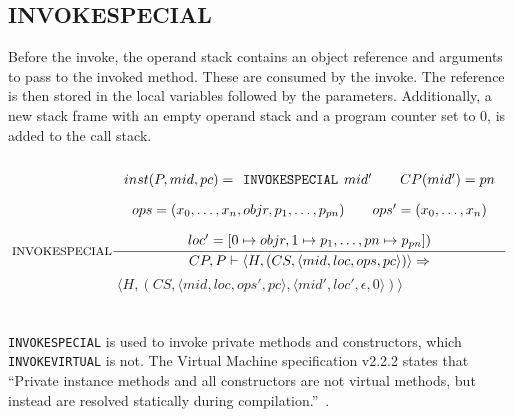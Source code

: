 \subsection{INVOKESPECIAL}
Before the invoke, the operand stack contains an object reference and arguments to pass to the invoked method. These are consumed by the invoke. The reference is then stored in the local variables followed by the parameters. Additionally, a new stack frame with an empty operand stack and a program counter set to $0$, is added to the call stack.\\\\
$$\inference[INVOKESPECIAL]{
inst(P,mid,pc) = \texttt{INVOKESPECIAL }mid' \semsp 
CP(mid') = pn \semnl \\
ops = (x_0, \ldots, x_n, objr, p_1, \ldots, p_{pn}) \semsp
ops' = (x_0, \ldots, x_{n}) \semnl\\
loc' = [0 \mapsto objr, 1 \mapsto p_{1}, \ldots, pn \mapsto p_{pn}])}
{CP, P \vdash \langle H, (CS, \langle mid, loc, ops, pc \rangle)\rangle \Rightarrow }$$
$$\langle H, (CS, \langle mid, loc, ops', pc \rangle, \langle mid', loc', \epsilon, 0 \rangle)\rangle$$\\\\
\texttt{INVOKESPECIAL} is used to invoke private methods and constructors, which \texttt{INVOKEVIRTUAL} is not. The \jc Virtual Machine specification v2.2.2 states that ``Private instance methods and all constructors are not virtual methods, but instead are resolved statically during compilation.''~\cite[chap. 4.3.7.6]{java_card_spec}.


